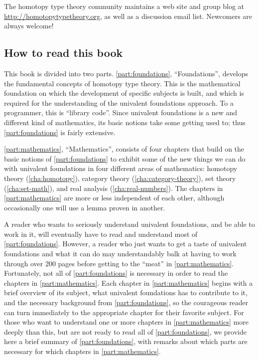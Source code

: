 The homotopy type theory community maintains a web site and group blog at \url{http://homotopytypetheory.org}, as well as a discussion email list.
Newcomers are always welcome!


\subsection*{How to read this book}

This book is divided into two parts.
\autoref{part:foundations}, ``Foundations'', develops the fundamental concepts of homotopy type theory.
This is the mathematical foundation on which the development of specific subjects is built, and which is required for the understanding of the univalent foundations approach. To a programmer, this is ``library code''.
Since univalent foundations is a new and different kind of mathematics, its basic notions take some getting used to; thus \autoref{part:foundations} is fairly extensive.

\autoref{part:mathematics}, ``Mathematics'', consists of four chapters that build on the basic notions of \autoref{part:foundations} to exhibit some of the new things we can do with univalent foundations in four different areas of mathematics: homotopy theory (\autoref{cha:homotopy}), category theory (\autoref{cha:category-theory}), set theory (\autoref{cha:set-math}), and real analysis (\autoref{cha:real-numbers}).
The chapters in \autoref{part:mathematics} are more or less independent of each other, although occasionally one will use a lemma proven in another.

A reader who wants to seriously understand univalent foundations, and be able to work in it, will eventually have to read and understand most of \autoref{part:foundations}.
However, a reader who just wants to get a taste of univalent foundations and what it can do may understandably balk at having to work through over 200 pages before getting to the ``meat'' in \autoref{part:mathematics}.
Fortunately, not all of \autoref{part:foundations} is necessary in order to read the chapters in \autoref{part:mathematics}.
Each chapter in \autoref{part:mathematics} begins with a brief overview of its subject, what univalent foundations has to contribute to it, and the necessary background from \autoref{part:foundations}, so the courageous reader can turn immediately to the appropriate chapter for their favorite subject.
For those who want to understand one or more chapters in \autoref{part:mathematics} more deeply than this, but are not ready to read all of \autoref{part:foundations}, we provide here a brief summary of \autoref{part:foundations}, with remarks about which parts are necessary for which chapters in \autoref{part:mathematics}.

